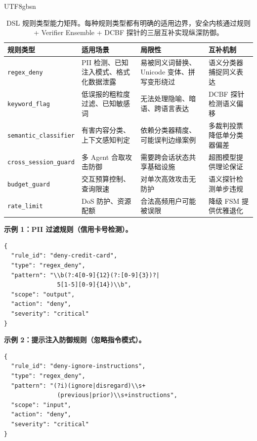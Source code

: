 \documentclass[letterpaper,twocolumn,10pt]{article}
\begin{document}
\begin{CJK}{UTF8}{gbsn}
\begin{table}[h]
\centering
\small
\setlength{\tabcolsep}{3pt}
\begin{tabular}{@{}p{2.8cm}p{3.5cm}p{3.5cm}p{3.2cm}@{}}
\toprule
\textbf{规则类型} & \textbf{适用场景} & \textbf{局限性} & \textbf{互补机制} \\
\midrule
\texttt{regex\_deny} & PII 检测、已知注入模式、格式化数据泄露 & 易被同义词替换、Unicode 变体、拼写变形绕过 & 语义分类器捕捉同义表达 \\
\texttt{keyword\_flag} & 低误报的粗粒度过滤、已知敏感词 & 无法处理隐喻、暗语、跨语言表达 & DCBF 探针检测语义偏移 \\
\texttt{semantic\_classifier} & 有害内容分类、上下文感知判定 & 依赖分类器精度、可能误判边缘案例 & 多裁判投票降低单分类器偏差 \\
\texttt{cross\_session\_guard} & 多 Agent 合取攻击防御 & 需要跨会话状态共享基础设施 & 超图模型提供理论保证 \\
\texttt{budget\_guard} & 交互预算控制、查询限速 & 对单次高效攻击无防护 & 语义探针检测单步违规 \\
\texttt{rate\_limit} & DoS 防护、资源配额 & 合法高频用户可能被误限 & 降级 FSM 提供优雅退化 \\
\bottomrule
\end{tabular}
\caption{DSL 规则类型能力矩阵。每种规则类型都有明确的适用边界，安全内核通过规则 + Verifier Ensemble + DCBF 探针的三层互补实现纵深防御。}
\label{tab:dsl-capability-matrix}
\end{table}

\noindent\textbf{示例 1：PII 过滤规则（信用卡号检测）。}

\begin{verbatim}
{
  "rule_id": "deny-credit-card",
  "type": "regex_deny",
  "pattern": "\\b(?:4[0-9]{12}(?:[0-9]{3})?|
               5[1-5][0-9]{14})\\b",
  "scope": "output",
  "action": "deny",
  "severity": "critical"
}
\end{verbatim}

\noindent\textbf{示例 2：提示注入防御规则（忽略指令模式）。}

\begin{verbatim}
{
  "rule_id": "deny-ignore-instructions",
  "type": "regex_deny",
  "pattern": "(?i)(ignore|disregard)\\s+
               (previous|prior)\\s+instructions",
  "scope": "input",
  "action": "deny",
  "severity": "critical"
}
\end{verbatim}


\end{CJK}
\end{document}
